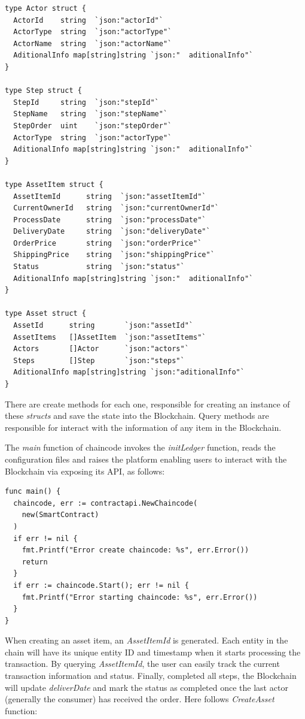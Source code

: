 \begin{lstlisting}
type Actor struct {
  ActorId    string  `json:"actorId"`
  ActorType  string  `json:"actorType"`
  ActorName  string  `json:"actorName"`
  AditionalInfo map[string]string `json:"  aditionalInfo"`
}

type Step struct {
  StepId     string  `json:"stepId"`
  StepName   string  `json:"stepName"`
  StepOrder  uint    `json:"stepOrder"`
  ActorType  string  `json:"actorType"`
  AditionalInfo map[string]string `json:"  aditionalInfo"`
}

type AssetItem struct {
  AssetItemId      string  `json:"assetItemId"`
  CurrentOwnerId   string  `json:"currentOwnerId"`
  ProcessDate      string  `json:"processDate"`
  DeliveryDate     string  `json:"deliveryDate"`
  OrderPrice       string  `json:"orderPrice"`
  ShippingPrice    string  `json:"shippingPrice"`
  Status           string  `json:"status"`
  AditionalInfo map[string]string `json:"  aditionalInfo"`
}

type Asset struct {
  AssetId      string       `json:"assetId"`
  AssetItems   []AssetItem  `json:"assetItems"`
  Actors       []Actor      `json:"actors"`
  Steps        []Step       `json:"steps"`
  AditionalInfo map[string]string `json:"aditionalInfo"`
}
\end{lstlisting}

There are create methods for each one,  responsible for creating an instance of these \textit{structs} and save the state into the Blockchain. Query methods are responsible for interact with the information of any item in the Blockchain.


The \textit{main} function of chaincode invokes the \textit{initLedger} function, reads the configuration files and raises the platform enabling users to interact with the Blockchain via exposing its API, as follows: 

\begin{lstlisting}
func main() {
  chaincode, err := contractapi.NewChaincode(
    new(SmartContract)
  )
  if err != nil {
    fmt.Printf("Error create chaincode: %s", err.Error())
    return
  }
  if err := chaincode.Start(); err != nil {
    fmt.Printf("Error starting chaincode: %s", err.Error())
  }
}
\end{lstlisting}

When creating an asset item, an  \textit{AssetItemId} is generated. Each entity in the chain will have its unique entity ID and timestamp when it starts processing the transaction. By querying \textit{AssetItemId}, the user can easily track the current transaction information and status. Finally, completed all steps, the Blockchain will update \textit{deliverDate} and mark the status as completed once the last actor (generally the consumer) has received the order. Here follows \textit{CreateAsset} function:

